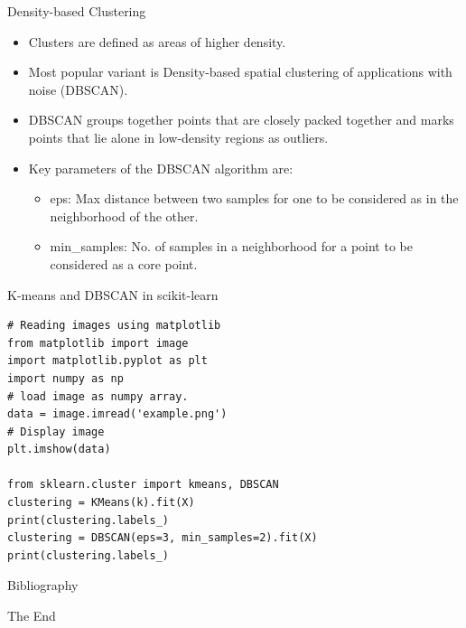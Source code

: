 \documentclass[aspectratio=169]{beamer}
\begin{document}
\begin{frame}{Density-based Clustering}
    \begin{itemize}
        \item Clusters are defined as areas of higher density.
        \item Most popular variant is Density-based spatial clustering of applications with noise (DBSCAN).\cite{esterDensityBasedAlgorithmDiscovering}
        \item DBSCAN groups together points that are closely packed together and marks points that lie alone in low-density regions as outliers. 
        \item Key parameters of the DBSCAN algorithm are:
        \begin{itemize}
            \item eps: Max distance between two samples for one to be considered as in the neighborhood of the other. 
            \item min\_samples: No. of samples in a neighborhood for a point to be considered as a core point.
        \end{itemize}
    \end{itemize}
\end{frame}


\begin{frame}[fragile]{K-means and DBSCAN in scikit-learn}
\begin{verbatim}
# Reading images using matplotlib
from matplotlib import image
import matplotlib.pyplot as plt
import numpy as np
# load image as numpy array.
data = image.imread('example.png')
# Display image
plt.imshow(data)

from sklearn.cluster import kmeans, DBSCAN
clustering = KMeans(k).fit(X)
print(clustering.labels_)
clustering = DBSCAN(eps=3, min_samples=2).fit(X)
print(clustering.labels_)
\end{verbatim}
\end{frame}



\begin{frame}{Bibliography}
    
    
\end{frame}




\begin{frame}
    \Huge{\centerline{The End}}
\end{frame}
\end{document}
